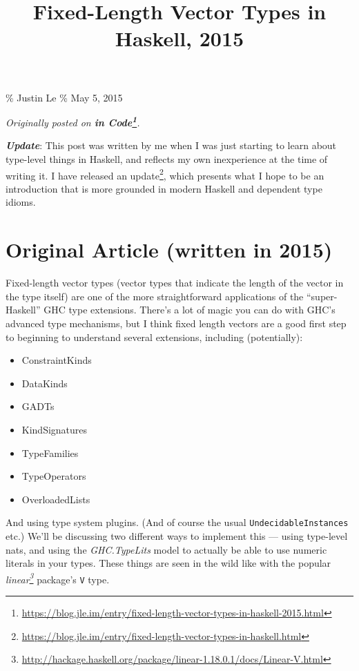 \documentclass[]{article}
\title{Fixed-Length Vector Types in Haskell, 2015}
\renewcommand{\href}[2]{#2\footnote{\url{#1}}}
\begin{document}
\maketitle

\% Justin Le \% May 5, 2015

\emph{Originally posted on
\textbf{\href{https://blog.jle.im/entry/fixed-length-vector-types-in-haskell-2015.html}{in
Code}}.}

\textbf{\emph{Update}}: This post was written by me when I was just starting to
learn about type-level things in Haskell, and reflects my own inexperience at
the time of writing it. I have
\href{https://blog.jle.im/entry/fixed-length-vector-types-in-haskell.html}{released
an update}, which presents what I hope to be an introduction that is more
grounded in modern Haskell and dependent type idioms.

\section{Original Article (written in
2015)}\label{original-article-written-in-2015}

Fixed-length vector types (vector types that indicate the length of the vector
in the type itself) are one of the more straightforward applications of the
``super-Haskell'' GHC type extensions. There's a lot of magic you can do with
GHC's advanced type mechanisms, but I think fixed length vectors are a good
first step to beginning to understand several extensions, including
(potentially):

\begin{itemize}
\tightlist
\item
  ConstraintKinds
\item
  DataKinds
\item
  GADTs
\item
  KindSignatures
\item
  TypeFamilies
\item
  TypeOperators
\item
  OverloadedLists
\end{itemize}

And using type system plugins. (And of course the usual
\texttt{UndecidableInstances} etc.) We'll be discussing two different ways to
implement this --- using type-level nats, and using the \emph{GHC.TypeLits}
model to actually be able to use numeric literals in your types. These things
are seen in the wild like with the popular
\emph{\href{http://hackage.haskell.org/package/linear-1.18.0.1/docs/Linear-V.html}{linear}}
package's \texttt{V} type.
\end{document}
